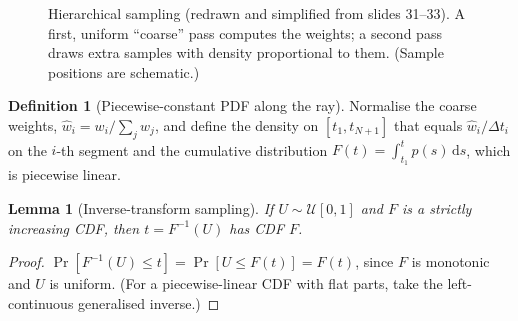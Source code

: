 \documentclass[11pt,a4paper]{article}
\newcommand{\dif}{\,\mathrm{d}}
\theoremstyle{definition}
\newtheorem{definition}{Definition}[section]
\theoremstyle{plain}
\newtheorem{lemma}{Lemma}[section]
\begin{document}
\begin{figure}[H]
\centering
{}
\caption{Hierarchical sampling (redrawn and simplified from slides 31--33). A first, uniform ``coarse'' pass computes the weights; a second pass draws extra samples with density proportional to them. (Sample positions are schematic.)}
\end{figure}

\begin{definition}[Piecewise-constant PDF along the ray]
Normalise the coarse weights, $\hat w_i=w_i/\sum_jw_j$, and define the density on $[t_1,t_{N+1}]$ that equals $\hat w_i/\Delta t_i$ on the $i$-th segment and the cumulative distribution $F(t)=\int_{t_1}^tp(s)\dif s$, which is piecewise linear.
\end{definition}

\begin{lemma}[Inverse-transform sampling]\label{lem:invcdf}
If $U\sim\mathcal U[0,1]$ and $F$ is a strictly increasing CDF, then $t=F^{-1}(U)$ has CDF $F$.
\end{lemma}
\begin{proof}
$\Pr[F^{-1}(U)\le t]=\Pr[U\le F(t)]=F(t)$, since $F$ is monotonic and $U$ is uniform. (For a piecewise-linear CDF with flat parts, take the left-continuous generalised inverse.)
\end{proof}
\end{document}
